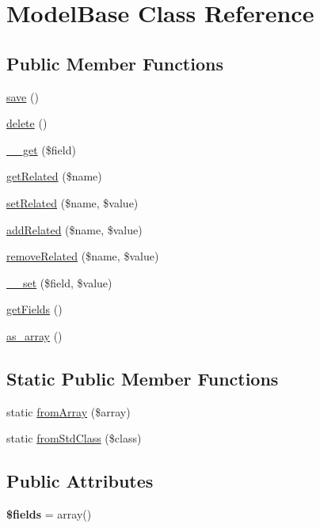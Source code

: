 \hypertarget{classModelBase}{\section{Model\-Base Class Reference}
\label{classModelBase}
}
\subsection*{Public Member Functions}
\begin{DoxyCompactItemize}
\item 
\hyperlink{classModelBase_afe2a0077074c8fd54372fae3461919b9}{save} ()
\item 
\hyperlink{classModelBase_a5183135ede8664baa606dbdf9fc2eca0}{delete} ()
\item 
\hyperlink{classModelBase_a1b3373e9cf5d2920528a0c46ddc7c42f}{\-\_\-\-\_\-get} (\$field)
\item 
\hyperlink{classModelBase_ae19b572d12d6a9d9e64556ec6b7a9c25}{get\-Related} (\$name)
\item 
\hyperlink{classModelBase_ad820af9bc876f247be8e15b44c8b4dc4}{set\-Related} (\$name, \$value)
\item 
\hyperlink{classModelBase_ac93115f1d4999b56db948a4097c978d0}{add\-Related} (\$name, \$value)
\item 
\hyperlink{classModelBase_a48e09bdaa1f60c48ccb73c13eca2e005}{remove\-Related} (\$name, \$value)
\item 
\hyperlink{classModelBase_a012bbaca3aa24a5c7f4ccd5f1c75999c}{\-\_\-\-\_\-set} (\$field, \$value)
\item 
\hyperlink{classModelBase_a8e1e93de9f1c2541ac66777e5513f34a}{get\-Fields} ()
\item 
\hyperlink{classModelBase_ae513caa9e2aa259e42e50003eb4de60a}{as\-\_\-array} ()
\end{DoxyCompactItemize}
\subsection*{Static Public Member Functions}
\begin{DoxyCompactItemize}
\item 
static \hyperlink{classModelBase_adffcc978a896a9f1c3dfc4cfbaf5202b}{from\-Array} (\$array)
\item 
static \hyperlink{classModelBase_a081976e021449729e21eea556201121e}{from\-Std\-Class} (\$class)
\end{DoxyCompactItemize}
\subsection*{Public Attributes}
\begin{DoxyCompactItemize}
\item 
\hypertarget{classModelBase_ac42d971c4d431e98db55742730696bc2}{{\bfseries \$fields} = array()}\label{classModelBase_ac42d971c4d431e98db55742730696bc2}

\end{DoxyCompactItemize}
